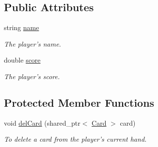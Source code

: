 \subsection*{Public Attributes}
\begin{DoxyCompactItemize}
\item 
\hypertarget{classPlayer_acf0355128a99ee20ad9931b760fb2de1}{string \hyperlink{classPlayer_acf0355128a99ee20ad9931b760fb2de1}{name}}\label{classPlayer_acf0355128a99ee20ad9931b760fb2de1}

\begin{DoxyCompactList}\small\item\em The player's name. \end{DoxyCompactList}\item 
\hypertarget{classPlayer_a55f7b5b674245c2e09f3c191a54d3542}{double \hyperlink{classPlayer_a55f7b5b674245c2e09f3c191a54d3542}{score}}\label{classPlayer_a55f7b5b674245c2e09f3c191a54d3542}

\begin{DoxyCompactList}\small\item\em The player's score. \end{DoxyCompactList}\end{DoxyCompactItemize}
\subsection*{Protected Member Functions}
\begin{DoxyCompactItemize}
\item 
void \hyperlink{classPlayer_a82c40ddca5214bbc9cc204ae9b789ca7}{del\-Card} (shared\-\_\-ptr$<$ \hyperlink{classCard}{Card} $>$ card)
\begin{DoxyCompactList}\small\item\em To delete a card from the player's current hand. \end{DoxyCompactList}\end{DoxyCompactItemize}
